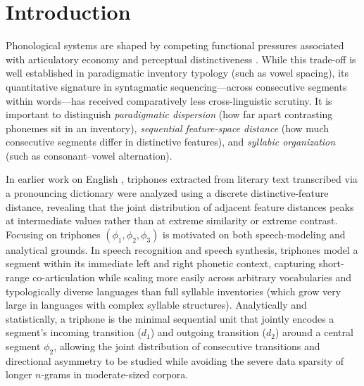 \documentclass{interact}
\begin{document}
\section{Introduction}
Phonological systems are shaped by competing functional pressures associated with articulatory economy and perceptual distinctiveness \citep{zipf1949,lindblom1990,flemming2004}. While this trade-off is well established in paradigmatic inventory typology (such as vowel spacing), its quantitative signature in syntagmatic sequencing---across consecutive segments within words---has received comparatively less cross-linguistic scrutiny. It is important to distinguish \emph{paradigmatic dispersion} (how far apart contrasting phonemes sit in an inventory), \emph{sequential feature-space distance} (how much consecutive segments differ in distinctive features), and \emph{syllabic organization} (such as consonant--vowel alternation).

In earlier work on English \citep{araujo2013thesis}, triphones extracted from literary text transcribed via a pronouncing dictionary were analyzed using a discrete distinctive-feature distance, revealing that the joint distribution of adjacent feature distances peaks at intermediate values rather than at extreme similarity or extreme contrast. Focusing on triphones $(\phi_1, \phi_2, \phi_3)$ is motivated on both speech-modeling and analytical grounds. In speech recognition and speech synthesis, triphones model a segment within its immediate left and right phonetic context, capturing short-range co-articulation while scaling more easily across arbitrary vocabularies and typologically diverse languages than full syllable inventories (which grow very large in languages with complex syllable structures). Analytically and statistically, a triphone is the minimal sequential unit that jointly encodes a segment's incoming transition ($d_1$) and outgoing transition ($d_2$) around a central segment $\phi_2$, allowing the joint distribution of consecutive transitions and directional asymmetry to be studied while avoiding the severe data sparsity of longer $n$-grams in moderate-sized corpora.
\end{document}
